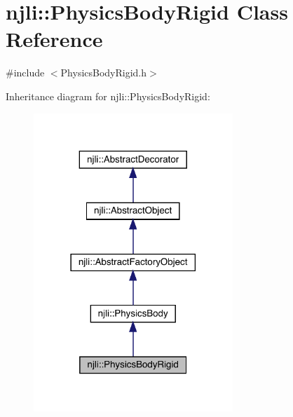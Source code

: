 \hypertarget{classnjli_1_1_physics_body_rigid}{}\section{njli\+:\+:Physics\+Body\+Rigid Class Reference}
\label{classnjli_1_1_physics_body_rigid}


{\ttfamily \#include $<$Physics\+Body\+Rigid.\+h$>$}



Inheritance diagram for njli\+:\+:Physics\+Body\+Rigid\+:\nopagebreak
\begin{figure}[H]
\begin{center}
\leavevmode
\includegraphics[width=213pt]{classnjli_1_1_physics_body_rigid__inherit__graph}
\end{center}
\end{figure}


